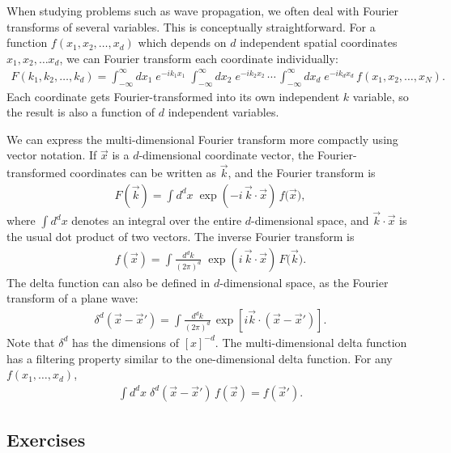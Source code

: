 \documentclass[10pt,a4paper]{article}
\begin{document}
When studying problems such as wave propagation, we often deal with
Fourier transforms of several variables.  This is conceptually
straightforward.  For a function $f(x_1, x_2, \dots, x_d)$ which
depends on $d$ independent spatial coordinates $x_1, x_2, \dots x_d$,
we can Fourier transform each coordinate individually:
\begin{align}
  F(k_1, k_2, \dots, k_d) = \int_{-\infty}^\infty dx_1\; e^{-ik_1x_1}\; \int_{-\infty}^\infty dx_2\; e^{-ik_2x_2}\,\cdots\, \int_{-\infty}^\infty dx_d\; e^{-ik_d x_d}\, f(x_1,x_2, \dots,x_N).
\end{align}
Each coordinate gets Fourier-transformed into its own independent $k$
variable, so the result is also a function of $d$ independent
variables.

We can express the multi-dimensional Fourier transform more compactly
using vector notation.  If $\vec{x}$ is a $d$-dimensional coordinate
vector, the Fourier-transformed coordinates can be written as
$\vec{k}$, and the Fourier transform is
\begin{align}
  F(\vec{k}) = \int d^d x \; \exp\left(-i\,\vec{k}\cdot\vec{x}\right) \, f\big(\vec{x}\big),
\end{align}
where $\int d^d x$ denotes an integral over the entire $d$-dimensional
space, and $\vec{k}\cdot\vec{x}$ is the usual dot product of two
vectors.  The inverse Fourier transform is
\begin{align}
  f(\vec{x}) = \int \frac{d^dk}{(2\pi)^d}\; \exp\left(i\,\vec{k}\cdot\vec{x}\right)\, F\big(\vec{k}\big).
\end{align}
The delta function can also be defined in $d$-dimensional space, as
the Fourier transform of a plane wave:
\begin{align}
  \delta^d(\vec{x}-\vec{x}') = \int \frac{d^dk}{(2\pi)^d} \, \exp\left[i\vec{k} \cdot \left(\vec{x}-\vec{x}'\right)\right].
\end{align}
Note that $\delta^d$ has the dimensions of $[x]^{-d}$.  The
multi-dimensional delta function has a filtering property similar to
the one-dimensional delta function. For any $f(x_1,\dots,x_d)$,
\begin{align}
  \int d^dx \; \delta^d(\vec{x}-\vec{x}') \, f(\vec{x}) = f(\vec{x}').
\end{align}

\subsection{Exercises}\label{exercises}
\end{document}

